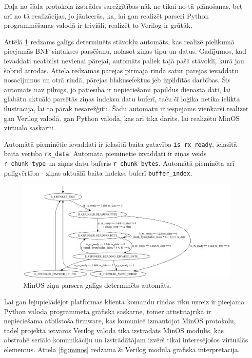 Daļa no šāda protokola izstrādes sarežģītības nāk ne tikai no tā plānošanas, bet
arī no tā realizācijas, jo jāatcerās, ka, lai gan realizēt parseri Python
programmēšanas valodā ir triviāli, realizēt to Verilog
 ir grūtāk.

Attēlā \ref{fig:chunkparser} redzams galīgs determinēts stāvokļu automāts, kas
realizē pielikumā pieejamās BNF sintakses parsēšanu, nolasot ziņas tipu un
datus. Gadījumos, kad ievaddati neatbilst nevienai pārejai, automāts paliek tajā
pašā stāvoklī, kurā jau šobrīd atrodās. Attēlā redzamās pārejas pirmajā rindā
satur pārejas ievaddatu nosacījumus un otrā rindā, pārejas blakusefektus jeb
izpildītās darbības. Šis automāts nav pilnīgs, jo patiesībā ir nepieciešami
papildus dienasta dati, lai glabātu aktuālo parsētās ziņas indeksu datu buferī,
taču šī loģika netika ielikta ilustrācijā, lai to pārāk nesarežģītu. Šādu
automātu ir iespējams vienkārši realizēt gan Verilog valodā, gan Python valodā,
kas arī tika darīts, lai realizētu MinOS virtuālo saskarni.

Automātā pieminētie ievaddati ir ielasītā baita gatavība
\lstinline!is_rx_ready!, ielasītā baita vērtība \lstinline!rx_data!. Automātā
pieminētie izvaddati ir ziņas veids \lstinline!r_chunk_type! un ziņas datu
buferis \lstinline!r_chunk_bytes!. Automātā pieminēta arī palīgvērtība - ziņas
aktuālā baita indekss buferī \lstinline!buffer_index!.

\begin{figure}[H]
    \includegraphics[width=1.0\linewidth]{assets/chunkparser.png}
    \centering
    \caption{MinOS ziņu parsera galīgs determinēts automāts.}
    \label{fig:chunkparser}
\end{figure}

Lai gan lejupielādējot platformas klienta komandu rindas rīku uzreiz ir pieejama
Python valodā programmētā grafiskā saskarne, tomēr attīstītājrīkā ir
nepieciešama atbilstoša \gls{firmware}, kas komunicē izmantojot MinOS protokolu,
tādēļ projekta ietvaros Verilog valodā tika izstrādāts MinOS modulis, kas
abstrahē seriālo komunikāciju un izstrādātājam izvērš tikai interesējošos
virtuālās  elementus. Attēlā \ref{fig:minos} redzama šī Verilog moduļa
grafiskā interpretācija. 

